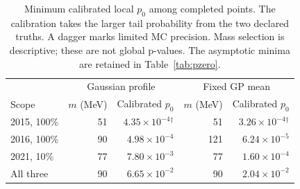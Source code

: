 \begin{table}[H]\centering\small
\begin{tabular}{lrrrr}\toprule
 & \multicolumn{2}{c}{Gaussian profile} & \multicolumn{2}{c}{Fixed GP mean}\\
Scope & $m$ (MeV) & Calibrated $p_0$ & $m$ (MeV) & Calibrated $p_0$\\\midrule
2015, 100\% & 51 & $4.35\times10^{-4}$$^{\dagger}$ & 51 & $3.26\times10^{-4}$$^{\dagger}$\\
2016, 100\% & 90 & $4.98\times10^{-4}$ & 121 & $6.24\times10^{-5}$\\
2021, 10\% & 77 & $7.80\times10^{-3}$ & 77 & $1.60\times10^{-4}$\\
All three & 90 & $6.65\times10^{-2}$ & 90 & $2.04\times10^{-2}$\\
\bottomrule\end{tabular}
\caption{Minimum calibrated local $p_0$ among completed points. The calibration takes the larger tail probability from the two declared truths. A dagger marks limited MC precision. Mass selection is descriptive; these are not global p-values. The asymptotic minima are retained in Table~\ref{tab:pzero}.}
\end{table}
